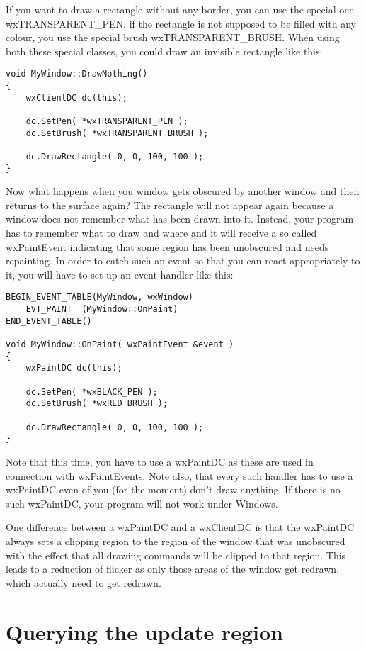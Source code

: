 If you want to draw a rectangle without any border, you can use the special
oen wxTRANSPARENT_PEN, if the rectangle is not supposed to be filled with
any colour, you use the special brush wxTRANSPARENT_BRUSH. When using both
these special classes, you could draw an invisible rectangle like this:

\begin{verbatim}
void MyWindow::DrawNothing()
{
    wxClientDC dc(this);
    
    dc.SetPen( *wxTRANSPARENT_PEN );
    dc.SetBrush( *wxTRANSPARENT_BRUSH );
    
    dc.DrawRectangle( 0, 0, 100, 100 );
}
\end{verbatim}

Now what happens when you window gets obscured by another window and 
then returns to the surface again? The rectangle will not appear again
because a window does not remember what has been drawn into it. Instead,
your program has to remember what to draw and where and it will receive
a so called wxPaintEvent indicating that some region has been unobscured
and needs repainting. In order to catch such an event so that you can
react appropriately to it, you will have to set up an event handler
like this:

\begin{verbatim}
BEGIN_EVENT_TABLE(MyWindow, wxWindow)
    EVT_PAINT  (MyWindow::OnPaint)
END_EVENT_TABLE()

void MyWindow::OnPaint( wxPaintEvent &event )
{
    wxPaintDC dc(this);
    
    dc.SetPen( *wxBLACK_PEN );
    dc.SetBrush( *wxRED_BRUSH );
    
    dc.DrawRectangle( 0, 0, 100, 100 );
}
\end{verbatim}

Note that this time, you have to use a wxPaintDC as these are used
in connection with wxPaintEvents. Note also, that every such handler
has to use a wxPaintDC even of you (for the moment) don't draw anything.
If there is no such wxPaintDC, your program will not work under Windows.

One difference between a wxPaintDC and a wxClientDC is that the wxPaintDC
always sets a clipping region to the region of the window that was
unobscured with the effect that all drawing commands will be clipped to
that region. This leads to a reduction of flicker as only those
areas of the window get redrawn, which actually need to get redrawn.

\section{Querying the update region}

